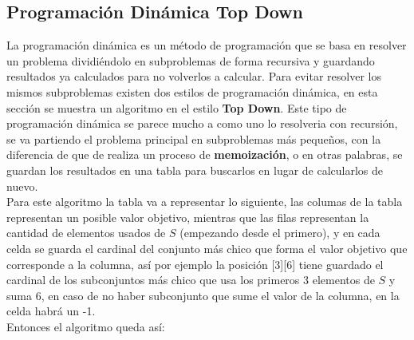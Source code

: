 \documentclass[a4paper]{article}
\begin{document}
\subsection{Programaci\'on Din\'amica Top Down}
La programación dinámica es un método de programación que se basa en resolver un problema dividiéndolo en subproblemas de forma recursiva y guardando resultados ya calculados para no volverlos a calcular. Para evitar resolver los mismos subproblemas existen dos estilos de programación dinámica, en esta sección se muestra un algoritmo en el estilo \textbf{Top Down}.
Este tipo de programación dinámica se parece mucho a como uno lo resolveria con recursión, se va partiendo el problema principal en subproblemas más pequeños, con la diferencia de que de realiza un proceso de \textbf{memoización}, o en otras palabras, se guardan los resultados en una tabla para buscarlos en lugar de calcularlos de nuevo.
\\
Para este algoritmo la tabla va a representar lo siguiente, las columas de la tabla representan un posible valor objetivo, mientras que las filas representan la cantidad de elementos usados de $S$ (empezando desde el primero), y en cada celda se guarda el cardinal del conjunto más chico que forma el valor objetivo que corresponde a la columna, así por ejemplo la posición [3][6] tiene guardado el cardinal de los subconjuntos más chico que usa los primeros 3 elementos de $S$ y suma $6$, en caso de no haber subconjunto que sume el valor de la columna, en la celda habrá un -1.
\\
Entonces el algoritmo queda así:
\end{document}
